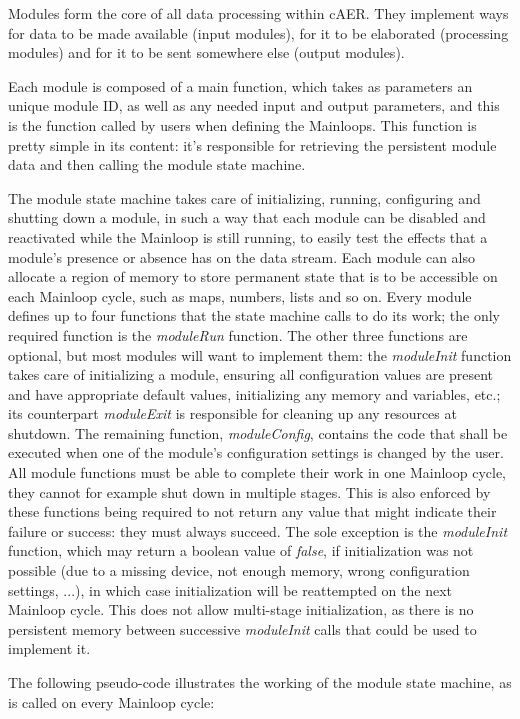 \documentclass[a4paper,12pt]{report}
\begin{document}
Modules form the core of all data processing within cAER.
They implement ways for data to be made available (input modules), for it to be elaborated (processing modules) and for it to be sent somewhere else (output modules).

Each module is composed of a main function, which takes as parameters an unique module ID, as well as any needed input and output parameters, and this is the function called by users when defining the Mainloops.
This function is pretty simple in its content: it's responsible for retrieving the persistent module data and then calling the module state machine.

The module state machine takes care of initializing, running, configuring and shutting down a module, in such a way that each module can be disabled and reactivated while the Mainloop is still running, to easily test the effects that a module's presence or absence has on the data stream.
Each module can also allocate a region of memory to store permanent state that is to be accessible on each Mainloop cycle, such as maps, numbers, lists and so on.
Every module defines up to four functions that the state machine calls to do its work; the only required function is the \emph{moduleRun} function. The other three functions are optional, but most modules will want to implement them: the \emph{moduleInit} function takes care of initializing a module, ensuring all configuration values are present and have appropriate default values, initializing any memory and variables, etc.; its counterpart \emph{moduleExit} is responsible for cleaning up any resources at shutdown. The remaining function, \emph{moduleConfig}, contains the code that shall be executed when one of the module's configuration settings is changed by the user.
All module functions must be able to complete their work in one Mainloop cycle, they cannot for example shut down in multiple stages. This is also enforced by these functions being required to not return any value that might indicate their failure or success: they must always succeed. The sole exception is the \emph{moduleInit} function, which may return a boolean value of \emph{false}, if initialization was not possible (due to a missing device, not enough memory, wrong configuration settings, ...), in which case initialization will be reattempted on the next Mainloop cycle. This does not allow multi-stage initialization, as there is no persistent memory between successive \emph{moduleInit} calls that could be used to implement it.

The following pseudo-code illustrates the working of the module state machine, as is called on every Mainloop cycle:
\end{document}
